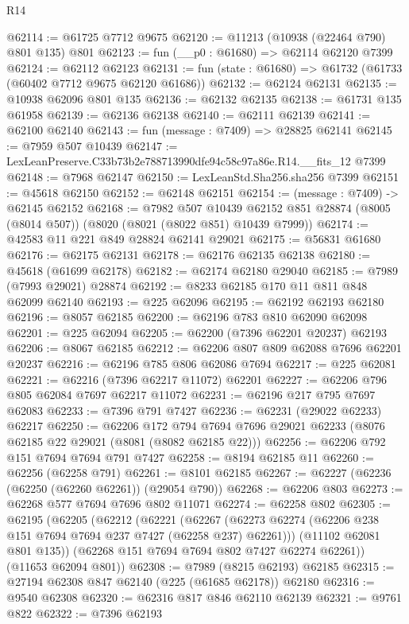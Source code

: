 \begin{lexlean}{R14}
\begin{coremodule}
@62114 := @61725 @7712 @9675
@62120 := @11213 (@10938 (@22464 @790) @801 @135) @801
@62123 := fun (__p0 : @61680) => @62114 @62120 @7399
@62124 := @62112 @62123
@62131 := fun (state : @61680) => @61732 (@61733 (@60402 @7712 @9675 @62120 @61686))
@62132 := @62124 @62131
@62135 := @10938 @62096 @801 @135
@62136 := @62132 @62135
@62138 := @61731 @135 @61958
@62139 := @62136 @62138
@62140 := @62111 @62139
@62141 := @62100 @62140
@62143 := fun (message : @7409) => @28825 @62141
@62145 := @7959 @507 @10439
@62147 := LexLeanPreserve.C33b73b2e788713990dfe94c58c97a86e.R14.__fits_12 @7399
@62148 := @7968 @62147
@62150 := LexLeanStd.Sha256.sha256 @7399
@62151 := @45618 @62150
@62152 := @62148 @62151
@62154 := (message : @7409) -> @62145 @62152
@62168 := @7982
    @507
    @10439
    @62152
    @851
    @28874
    (@8005 (@8014 @507))
    (@8020 (@8021 (@8022 @851) @10439 @7999))
@62174 := @42583 @11 @221 @849 @28824 @62141 @29021
@62175 := @56831 @61680
@62176 := @62175 @62131
@62178 := @62176 @62135 @62138
@62180 := @45618 (@61699 @62178)
@62182 := @62174 @62180 @29040
@62185 := @7989 (@7993 @29021) @28874
@62192 := @8233 @62185 @170 @11 @811 @848 @62099 @62140
@62193 := @225 @62096
@62195 := @62192 @62193 @62180
@62196 := @8057 @62185
@62200 := @62196 @783 @810 @62090 @62098
@62201 := @225 @62094
@62205 := @62200 (@7396 @62201 @20237) @62193
@62206 := @8067 @62185
@62212 := @62206 @807 @809 @62088 @7696 @62201 @20237
@62216 := @62196 @785 @806 @62086 @7694
@62217 := @225 @62081
@62221 := @62216 (@7396 @62217 @11072) @62201
@62227 := @62206 @796 @805 @62084 @7697 @62217 @11072
@62231 := @62196 @217 @795 @7697 @62083
@62233 := @7396 @791 @7427
@62236 := @62231 (@29022 @62233) @62217
@62250 := @62206
    @172
    @794
    @7694
    @7696
    @29021
    @62233
    (@8076 @62185 @22 @29021 (@8081 (@8082 @62185 @22)))
@62256 := @62206 @792 @151 @7694 @7694 @791 @7427
@62258 := @8194 @62185 @11
@62260 := @62256 (@62258 @791)
@62261 := @8101 @62185
@62267 := @62227 (@62236 (@62250 (@62260 @62261)) (@29054 @790))
@62268 := @62206 @803
@62273 := @62268 @577 @7694 @7696 @802 @11071
@62274 := @62258 @802
@62305 := @62195
    (@62205
      (@62212
        (@62221
          (@62267 (@62273 @62274 (@62206 @238 @151 @7694 @7694 @237 @7427 (@62258 @237) @62261)))
          (@11102 @62081 @801 @135))
        (@62268 @151 @7694 @7694 @802 @7427 @62274 @62261))
      (@11653 @62094 @801))
@62308 := @7989 (@8215 @62193) @62185
@62315 := @27194 @62308 @847 @62140 (@225 (@61685 @62178)) @62180
@62316 := @9540 @62308
@62320 := @62316 @817 @846 @62110 @62139
@62321 := @9761 @822
@62322 := @7396 @62193

\end{coremodule}
\end{lexlean}
